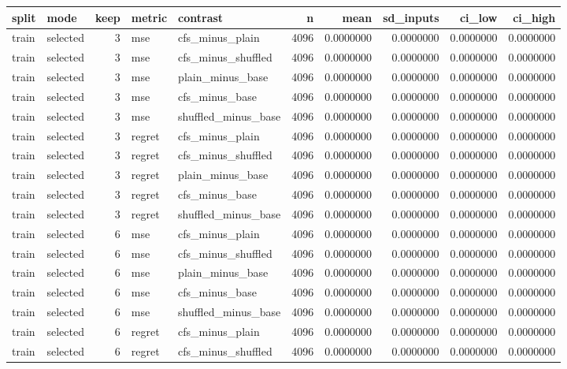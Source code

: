 \begin{tabular}{llrllrrrrr}
\toprule
split & mode & keep & metric & contrast & n & mean & sd_inputs & ci_low & ci_high \\
\midrule
train & selected & 3 & mse & cfs_minus_plain & 4096 & 0.0000000 & 0.0000000 & 0.0000000 & 0.0000000 \\
train & selected & 3 & mse & cfs_minus_shuffled & 4096 & 0.0000000 & 0.0000000 & 0.0000000 & 0.0000000 \\
train & selected & 3 & mse & plain_minus_base & 4096 & 0.0000000 & 0.0000000 & 0.0000000 & 0.0000000 \\
train & selected & 3 & mse & cfs_minus_base & 4096 & 0.0000000 & 0.0000000 & 0.0000000 & 0.0000000 \\
train & selected & 3 & mse & shuffled_minus_base & 4096 & 0.0000000 & 0.0000000 & 0.0000000 & 0.0000000 \\
train & selected & 3 & regret & cfs_minus_plain & 4096 & 0.0000000 & 0.0000000 & 0.0000000 & 0.0000000 \\
train & selected & 3 & regret & cfs_minus_shuffled & 4096 & 0.0000000 & 0.0000000 & 0.0000000 & 0.0000000 \\
train & selected & 3 & regret & plain_minus_base & 4096 & 0.0000000 & 0.0000000 & 0.0000000 & 0.0000000 \\
train & selected & 3 & regret & cfs_minus_base & 4096 & 0.0000000 & 0.0000000 & 0.0000000 & 0.0000000 \\
train & selected & 3 & regret & shuffled_minus_base & 4096 & 0.0000000 & 0.0000000 & 0.0000000 & 0.0000000 \\
train & selected & 6 & mse & cfs_minus_plain & 4096 & 0.0000000 & 0.0000000 & 0.0000000 & 0.0000000 \\
train & selected & 6 & mse & cfs_minus_shuffled & 4096 & 0.0000000 & 0.0000000 & 0.0000000 & 0.0000000 \\
train & selected & 6 & mse & plain_minus_base & 4096 & 0.0000000 & 0.0000000 & 0.0000000 & 0.0000000 \\
train & selected & 6 & mse & cfs_minus_base & 4096 & 0.0000000 & 0.0000000 & 0.0000000 & 0.0000000 \\
train & selected & 6 & mse & shuffled_minus_base & 4096 & 0.0000000 & 0.0000000 & 0.0000000 & 0.0000000 \\
train & selected & 6 & regret & cfs_minus_plain & 4096 & 0.0000000 & 0.0000000 & 0.0000000 & 0.0000000 \\
train & selected & 6 & regret & cfs_minus_shuffled & 4096 & 0.0000000 & 0.0000000 & 0.0000000 & 0.0000000 \\

\end{tabular}
